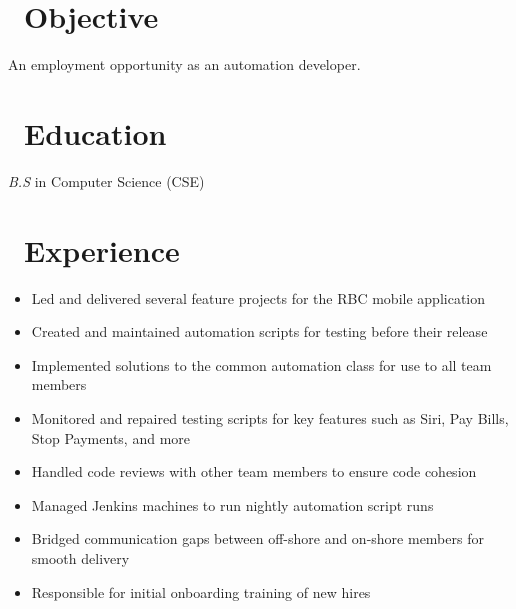 \documentclass{resume}
\begin{document}



\section{\faSearch\ Objective}
An employment opportunity as an automation developer.

\section{\faGraduationCap\ Education}
\textit{B.S} in Computer Science (CSE)

\section{\faUsers\ Experience}
\role{QA Analyst}

\begin{itemize}
  \item Led and delivered several feature projects for the RBC mobile application
  \item Created and maintained automation scripts for testing before their release
  \item Implemented solutions to the common automation class for use to all team members
  \item Monitored and repaired testing scripts for key features such as Siri, Pay Bills, Stop Payments, and more
  \item Handled code reviews with other team members to ensure code cohesion
  \item Managed Jenkins machines to run nightly automation script runs
  \item Bridged communication gaps between off-shore and on-shore members for smooth delivery
  \item Responsible for initial onboarding training of new hires
\end{itemize}

\end{document}
